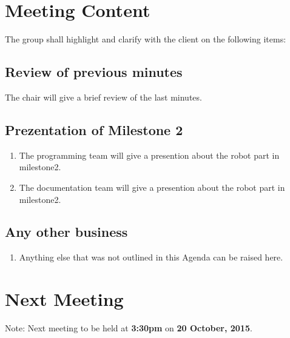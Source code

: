 \documentclass[a4paper] {article}
\begin{document}
	\section{Meeting Content}
	The group shall highlight and clarify with the client on the following items:
	
	\subsection{Review of previous minutes}
	The chair will give a brief review of the last minutes.
   
   \subsection{Prezentation of Milestone 2}
	\begin{enumerate}
	\item The programming team will give a presention about the robot part in milestone2.
	\item The documentation team will give a presention about the robot part in milestone2.
   \end{enumerate}
   
   \subsection{Any other business}
	\begin{enumerate}
	\item Anything else that was not outlined in this Agenda can be raised here.
   \end{enumerate}
   
	\section{Next Meeting}
	Note: Next meeting to be held at \textbf{3:30pm} on \textbf {20 October, 2015}. 
	
\end{document}
